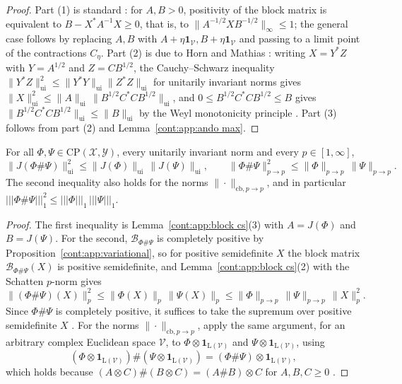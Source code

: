 \begin{proof}
Part (1) is standard \cite[Chapter~1]{Bhatia2007positive}: for $A,B>0$, positivity of the block matrix is equivalent to $B-X^*A^{-1}X\geq0$, that is, to $\|A^{-1/2}XB^{-1/2}\|_\infty\leq1$; the general case follows by replacing $A,B$ with $A+\eta\mathbf{1}_{\mathcal{V}},B+\eta\mathbf{1}_{\mathcal{V}}$ and passing to a limit point of the contractions $C_\eta$. Part (2) is due to Horn and Mathias \cite{HornMathias1990}: writing $X=Y^*Z$ with $Y=A^{1/2}$ and $Z=CB^{1/2}$, the Cauchy--Schwarz inequality $\|Y^*Z\|_{\mathrm{ui}}^2\leq\|Y^*Y\|_{\mathrm{ui}}\|Z^*Z\|_{\mathrm{ui}}$ for unitarily invariant norms \cite{HornMathias1990,BhatiaDavis1995} gives $\|X\|_{\mathrm{ui}}^2\leq\|A\|_{\mathrm{ui}}\,\|B^{1/2}C^*CB^{1/2}\|_{\mathrm{ui}}$, and $0\leq B^{1/2}C^*CB^{1/2}\leq B$ gives $\|B^{1/2}C^*CB^{1/2}\|_{\mathrm{ui}}\leq\|B\|_{\mathrm{ui}}$ by the Weyl monotonicity principle \cite[Section~III.2]{bhatia1997matrix}. Part (3) follows from part (2) and Lemma~\ref{cont:app:ando max}.
\end{proof}
 
\begin{theorem}\label{cont:app:cs maps}
For all $\Phi,\Psi\in\mathrm{CP}(\mathcal{X},\mathcal{Y})$, every unitarily invariant norm and every $p\in[1,\infty]$,
\[
\|J(\Phi\#\Psi)\|_{\mathrm{ui}}^2\leq\|J(\Phi)\|_{\mathrm{ui}}\,\|J(\Psi)\|_{\mathrm{ui}},\qquad
\|\Phi\#\Psi\|_{p\to p}^2\leq\|\Phi\|_{p\to p}\,\|\Psi\|_{p\to p}.
\]
The second inequality also holds for the norms $\|\cdot\|_{\mathrm{cb},p\to p}$, and in particular $|||\Phi\#\Psi|||_1^2\leq|||\Phi|||_1\,|||\Psi|||_1$.
\end{theorem}
 
\begin{proof}
The first inequality is Lemma~\ref{cont:app:block cs}(3) with $A=J(\Phi)$ and $B=J(\Psi)$. For the second, $\mathcal{B}_{\Phi\#\Psi}$ is completely positive by Proposition~\ref{cont:app:variational}, so for positive semidefinite $X$ the block matrix $\mathcal{B}_{\Phi\#\Psi}(X)$ is positive semidefinite, and Lemma~\ref{cont:app:block cs}(2) with the Schatten $p$-norm gives
\[
\|(\Phi\#\Psi)(X)\|_p^2\leq\|\Phi(X)\|_p\,\|\Psi(X)\|_p\leq\|\Phi\|_{p\to p}\,\|\Psi\|_{p\to p}\,\|X\|_p^2 .
\]
Since $\Phi\#\Psi$ is completely positive, it suffices to take the supremum over positive semidefinite $X$ \cite{Watrous2005notes}. For the norms $\|\cdot\|_{\mathrm{cb},p\to p}$, apply the same argument, for an arbitrary complex Euclidean space $\mathcal{V}$, to $\Phi\otimes\mathbf{1}_{\mathrm{L}(\mathcal{V})}$ and $\Psi\otimes\mathbf{1}_{\mathrm{L}(\mathcal{V})}$, using
\[
(\Phi\otimes\mathbf{1}_{\mathrm{L}(\mathcal{V})})\#(\Psi\otimes\mathbf{1}_{\mathrm{L}(\mathcal{V})})=(\Phi\#\Psi)\otimes\mathbf{1}_{\mathrm{L}(\mathcal{V})},
\]
which holds because $(A\otimes C)\#(B\otimes C)=(A\#B)\otimes C$ for $A,B,C\geq0$ \cite{KuboAndo1980}.
\end{proof}

\endgroup
